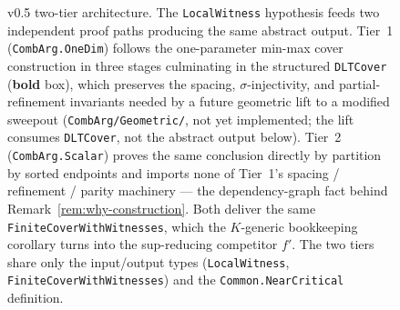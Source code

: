 \begin{figure}[tb]
\caption{\label{fig:arch}\CombArg{} v0.5 two-tier architecture.
The \texttt{LocalWitness} hypothesis feeds two independent proof
paths producing the same abstract output. Tier~1
(\texttt{CombArg.OneDim}) follows the one-parameter min-max
cover construction in three stages culminating in the structured
\texttt{DLTCover} (\textbf{bold} box), which preserves the
spacing, $\sigma$-injectivity, and partial-refinement invariants
needed by a future geometric lift to a modified sweepout
(\texttt{CombArg/Geometric/}, not yet implemented; the lift
consumes \texttt{DLTCover}, not the abstract output below).
Tier~2 (\texttt{CombArg.Scalar}) proves the same conclusion
directly by partition by sorted endpoints and imports none of
Tier~1's spacing / refinement / parity machinery --- the
dependency-graph fact behind
Remark~\ref{rem:why-construction}. Both deliver the same
\texttt{FiniteCoverWithWitnesses}, which the $K$-generic
bookkeeping corollary turns into the sup-reducing competitor $f'$.
The two tiers share only the input/output types
(\texttt{LocalWitness}, \texttt{FiniteCoverWithWitnesses}) and the
\texttt{Common.NearCritical} definition.}
\end{figure}

